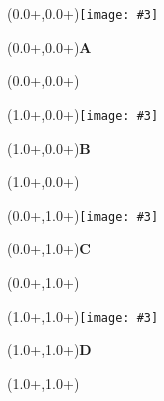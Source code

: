 \documentclass{article}
\newlength{\panelWidth} \newlength{\panelHeight}
\newlength{\labXshift} \newlength{\labYshift}
\newlength{\picXshift} \newlength{\picYshift}
\newlength{\txtXshift} \newlength{\txtYshift}
\newlength{\picWidth}
\newcommand{\txt}[3]{\begin{textblock*}{\panelWidth}(#1+\txtXshift,#2+\txtYshift){#3}\end{textblock*}}
\newcommand{\lab}[3]{\begin{textblock*}{\panelWidth}(#1+\labXshift,#2+\labYshift)\textbf{\LARGE #3}\end{textblock*}}
\newcommand{\pic}[3]{\begin{textblock*}{\panelWidth}(#1+\picXshift,#2+\picYshift)\texttt{[image: \#3]}\end{textblock*}}
\newcommand{\fig}[5]{  \pic{#1}{#2}{#4} \lab{#1}{#2}{#3} \txt{#1}{#2}{#5} }
\begin{document}


\fig{0.0\panelWidth}{0.0\panelHeight}{A}{../output_fig5new/Figure5A.pdf}{}
\fig{1.0\panelWidth}{0.0\panelHeight}{B}{../output_fig5new/Figure5B1.pdf}{}
\fig{0.0\panelWidth}{1.0\panelHeight}{C}{../output_fig5new/Figure5C.pdf}{}
\fig{1.0\panelWidth}{1.0\panelHeight}{D}{../output_fig5new/Figure5D.pdf}{}
\end{document}
